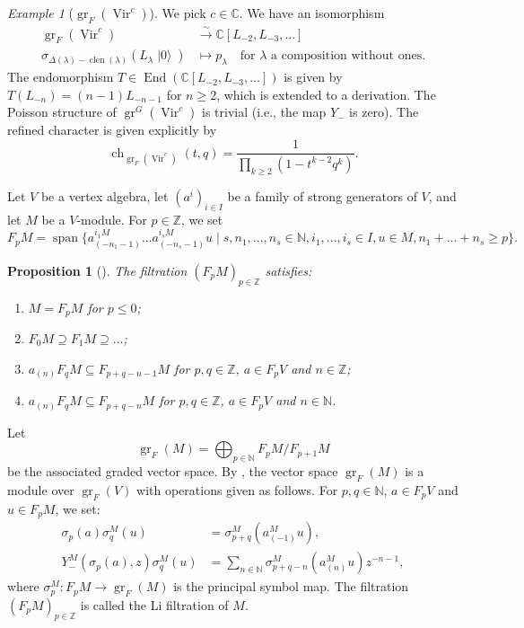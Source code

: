 \documentclass[a4paper, 12pt, reqno]{amsart}
\newtheorem{proposition}[theorem]{Proposition}
\theoremstyle{remark}
\newtheorem{example}[theorem]{Example}
\DeclareMathOperator{\Vir}{Vir}
\DeclareMathOperator{\ch}{ch}
\DeclareMathOperator{\clen}{clen}
\DeclareMathOperator{\vac}{|0\rangle}
\DeclareMathOperator{\gr}{gr}
\DeclareMathOperator{\vspan}{span}
\DeclareMathOperator{\End}{End}
\begin{document}
\begin{example}[$\gr_F(\Vir^c)$]
  \label{exa:14}
  We pick $c \in \mathbb{C}$.
  We have an isomorphism
  \begin{align*}
    \gr_F(\Vir^c) &\xrightarrow{\sim} \mathbb{C}[L_{-2}, L_{-3}, \dots] \\
    \sigma_{\Delta(\lambda) - \clen(\lambda)}(L_{\lambda}\vac) &\mapsto p_{\lambda} \quad \text{for $\lambda$ a composition without ones}.
  \end{align*}
  The endomorphism $T \in \End(\mathbb{C}[L_{-2}, L_{-3}, \dots])$ is given by $T(L_{-n}) = (n - 1)L_{-n - 1}$ for $n \ge 2$, which is extended to a derivation.
  The Poisson structure of $\gr^G(\Vir^c)$ is trivial (i.e., the map $Y_-$ is zero).
  The refined character is given explicitly by
  \begin{equation*}
    \ch_{\gr_F(\Vir^c)}(t, q) = \frac{1}{\prod_{k \ge 2}(1 - t^{k - 2}q^k)}.
  \end{equation*}
\end{example}

Let $V$ be a vertex algebra, let $(a^i)_{i \in I}$ be a family of strong generators of $V$, and let $M$ be a $V$-module.
For $p \in \mathbb{Z}$, we set
\begin{equation*}
  F_pM = \vspan\{a^{i_1M}_{(-n_1 - 1)}\dots a^{i_sM}_{(-n_s - 1)}u \mid s, n_1, \dots, n_s \in \mathbb{N}, i_1, \dots, i_s \in I, u \in M, n_1 + \dots + n_s \ge p\}.
\end{equation*}

\begin{proposition}[{\cite{li_abelianizing_2005}}]
  \label{prp:7}
  The filtration $(F_pM)_{p \in \mathbb{Z}}$ satisfies:
  \begin{enumerate}
  \item $M = F_pM$ for $p \le 0$;
  \item $F_0M \supseteq F_1M \supseteq \dots$;
  \item $a_{(n)}F_qM \subseteq F_{p + q - n - 1}M$ for $p, q \in \mathbb{Z}$, $a \in F_pV$ and $n \in \mathbb{Z}$;
  \item $a_{(n)}F_qM \subseteq F_{p + q - n}M$ for $p, q \in \mathbb{Z}$, $a \in F_pV$ and $n \in \mathbb{N}$.
  \end{enumerate}
\end{proposition}

Let
\begin{equation*}
  \gr_F(M) = \bigoplus_{p \in \mathbb{N}}F_pM/F_{p + 1}M
\end{equation*}
be the associated graded vector space.
By \cite{li_abelianizing_2005}, the vector space $\gr_F(M)$ is a module over $\gr_F(V)$ with operations given as follows.
For $p, q \in \mathbb{N}$, $a \in F_pV$ and $u \in F_pM$, we set:
\begin{align*}
  \sigma_p(a)\sigma^M_q(u) &= \sigma^M_{p + q}(a^M_{(-1)}u), \\
  Y^M_-(\sigma_p(a), z)\sigma^M_q(u) &= \sum_{n \in \mathbb{N}}\sigma^M_{p + q - n}(a^M_{(n)}u)z^{-n - 1},
\end{align*}
where $\sigma^M_p: F_pM \to \gr_F(M)$ is the principal symbol map.
The filtration $(F_pM)_{p \in \mathbb{Z}}$ is called the Li filtration of $M$.
\end{document}
